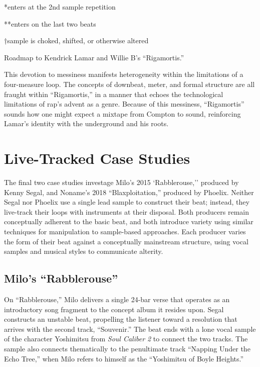 \begin{table}[h!]
\hfill{*enters at the 2nd sample repetition}

\hfill{**enters on the last two beats}

\hfill{†sample is choked, shifted, or otherwise altered}
    \caption{Roadmap to Kendrick Lamar and Willie B's ``Rigamortis.''}
    \label{tab:2}
\end{table}

\normalsize This devotion to messiness manifests heterogeneity within the limitations of a four-measure loop. The concepts of downbeat, meter, and formal structure are all fraught within ``Rigamortis,'' in a manner that echoes the technological limitations of rap's advent as a genre. Because of this messiness, ``Rigamortis'' sounds how one might expect a mixtape from Compton to sound, reinforcing Lamar's identity with the underground and his roots.

\clearpage
\section{Live-Tracked Case Studies}
The final two case studies investage Milo's 2015 `Rabblerouse,'' produced by Kenny Segal, and Noname's 2018 ``Blaxploitation,'' produced by Phoelix. Neither Segal nor Phoelix use a single lead sample to construct their beat; instead, they live-track their loops with instruments at their disposal. Both producers remain conceptually adherent to the basic beat, and both introduce variety using similar techniques for manipulation to sample-based approaches. Each producer varies the form of their beat against a conceptually mainstream structure, using vocal samples and musical styles to communicate alterity.

\subsection*{\centering Milo's ``Rabblerouse''}

On ``Rabblerouse,'' Milo delivers a single 24-bar verse that operates as an introductory song fragment to the concept album it resides upon. Segal constructs an unstable beat, propelling the listener toward a resolution that arrives with the second track, ``Souvenir.'' The beat ends with a lone vocal sample of the character Yoshimitsu from \textit{Soul Caliber 2} to connect the two tracks. The sample also connects thematically to the penultimate track ``Napping Under the Echo Tree,'' when Milo refers to himself as the ``Yoshimitsu of Boyle Heights.''

